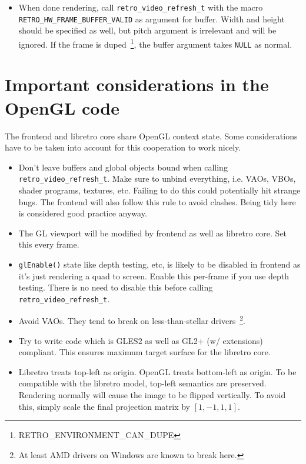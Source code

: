 \documentclass[11pt]{article}
\begin{document}
\begin{itemize}
\item When done rendering, call \texttt{retro\_video\_refresh\_t} with the macro \texttt{RETRO\_HW\_FRAME\_BUFFER\_VALID} as argument for buffer. Width and height should be specified as well, but pitch argument is irrelevant and will be ignored. If the frame is duped~\footnote{RETRO\_ENVIRONMENT\_CAN\_DUPE}, the buffer argument takes \texttt{NULL} as normal.
\end{itemize}

\section*{Important considerations in the OpenGL code}
The frontend and libretro core share OpenGL context state. Some considerations have to be taken into account for this cooperation to work nicely.

\begin{itemize}
\item Don't leave buffers and global objects bound when calling \\\texttt{retro\_video\_refresh\_t}.
Make sure to unbind everything, i.e. VAOs, VBOs, shader programs, textures, etc. Failing to do this could potentially hit strange bugs. The frontend will also follow this rule to avoid clashes. Being tidy here is considered good practice anyway.

\item The GL viewport will be modified by frontend as well as libretro core. Set this every frame.

\item \texttt{glEnable()} state like depth testing, etc, is likely to be disabled in frontend as it's just rendering a quad to screen. Enable this per-frame if you use depth testing.
There is no need to disable this before calling \\\texttt{retro\_video\_refresh\_t}.

\item Avoid VAOs. They tend to break on less-than-stellar drivers~\footnote{At least AMD drivers on Windows are known to break here.}.

\item Try to write code which is GLES2 as well as GL2+ (w/ extensions) compliant. This ensures maximum target surface for the libretro core.

\item Libretro treats top-left as origin. OpenGL treats bottom-left as origin. To be compatible with the libretro model, top-left semantics are preserved. Rendering normally will cause the image to be flipped vertically. To avoid this, simply scale the final projection matrix by $[1, -1, 1, 1]$.
\end{itemize} 
\end{document}
